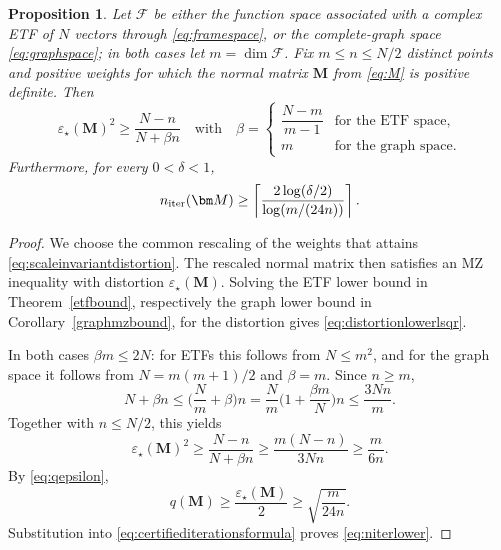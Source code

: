 \documentclass[a4paper]{amsart}
\numberwithin{equation}{section}
\newtheorem{proposition}[theorem]{Proposition}
\begin{document}
\begin{proposition}\label{niterlower}
    Let $\mathcal F$ be either the function space associated with a complex ETF of $N$ vectors through \eqref{eq:framespace}, or the complete-graph space \eqref{eq:graphspace}; in both cases let $m=\dim\mathcal F$.
    Fix $m\le n\le N/2$ distinct points and positive weights for which the normal matrix $\bm M$ from \eqref{eq:M} is positive definite.
    Then
    \begin{equation}\label{eq:distortionlowerlsqr}
        \varepsilon_\star(\bm M)^2
        \ge \frac{N-n}{N+\beta n}
        \quad\text{with}\quad
        \beta=
        \begin{cases}
            \dfrac{N-m}{m-1} &\text{for the ETF space},\\
            m &\text{for the graph space}.
        \end{cases}
    \end{equation}
    Furthermore, for every $0<\delta<1$,
    \begin{equation}\label{eq:niterlower}
        n_{\rm iter}(\bm M)
        \ge
        \left\lceil
        \frac{2\log(\delta/2)}{\log(m/(24n))}
        \right\rceil.
    \end{equation}
\end{proposition}

\begin{proof}
    We choose the common rescaling of the weights that attains \eqref{eq:scaleinvariantdistortion}.
    The rescaled normal matrix then satisfies an MZ inequality with distortion $\varepsilon_\star(\bm M)$.
    Solving the ETF lower bound in Theorem~\ref{etfbound}, respectively the graph lower bound in Corollary~\ref{graphmzbound}, for the distortion gives \eqref{eq:distortionlowerlsqr}.

    In both cases $\beta m\le2N$: for ETFs this follows from $N\le m^2$, and for the graph space it follows from $N=m(m+1)/2$ and $\beta=m$.
    Since $n\ge m$,
    \begin{equation*}
        N+\beta n
        \le \Big(\frac Nm+\beta\Big)n
        =\frac Nm\Big(1+\frac{\beta m}{N}\Big)n
        \le\frac{3Nn}{m}.
    \end{equation*}
    Together with $n\le N/2$, this yields
    \begin{equation*}
        \varepsilon_\star(\bm M)^2
        \ge\frac{N-n}{N+\beta n}
        \ge\frac{m(N-n)}{3Nn}
        \ge\frac{m}{6n}.
    \end{equation*}
    By \eqref{eq:qepsilon},
    \begin{equation*}
        q(\bm M)
        \ge\frac{\varepsilon_\star(\bm M)}2
        \ge\sqrt{\frac{m}{24n}}.
    \end{equation*}
    Substitution into \eqref{eq:certifiediterationsformula} proves \eqref{eq:niterlower}.
\end{proof}
\end{document}

